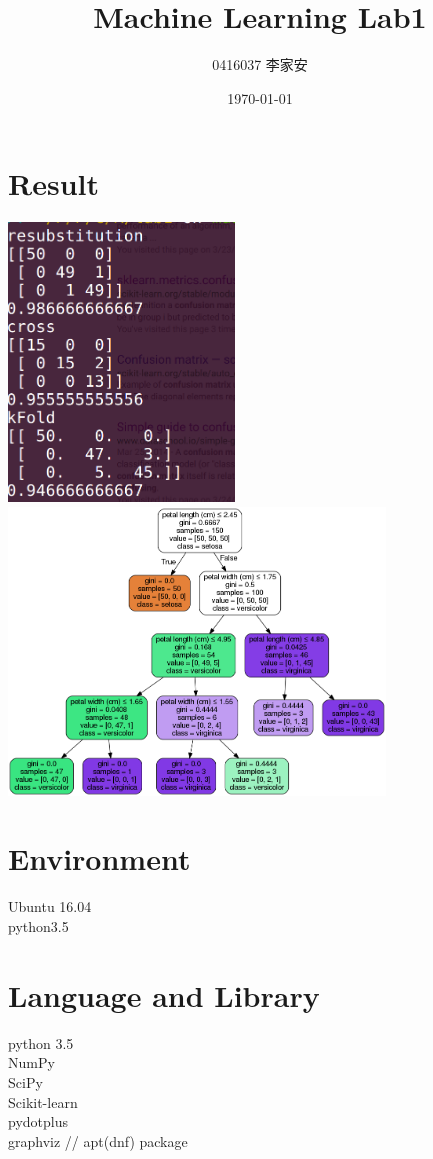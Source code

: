 \documentclass[12pt,a4paper]{article}
\title{Machine Learning Lab1}
\author{0416037 李家安}
\date{\today}
\begin{document}
\begin{CJK}{UTF8}{bsmi}
\graphicspath{ {images/} }
\maketitle
\section{Result}
\includegraphics[width=6cm]{result.png}
\includegraphics[width=10cm]{iris.png}
\section{Environment}
Ubuntu 16.04\\
python3.5
\section{Language and Library}
python 3.5\\
NumPy\\
SciPy\\
Scikit-learn\\
pydotplus\\
graphviz // apt(dnf) package

\end{CJK}
\end{document}
